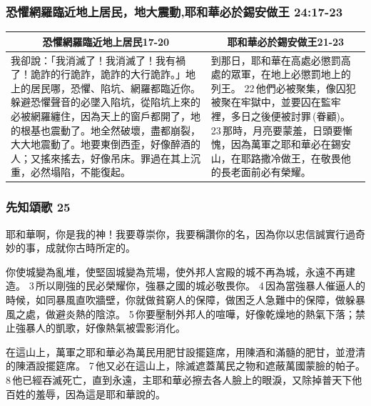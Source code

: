 \subsubsection{恐懼網羅臨近地上居民，地大震動,耶和華必於錫安做王 24:17-23}
\begin{table}[H]
\centering
\begin{tabular}{p{9.75cm}|p{7.50cm}}\hline\hline
\multicolumn{1}{c|}{恐懼網羅臨近地上居民17-20}&\multicolumn{1}{c}{耶和華必於錫安做王21-23}\\\hline
我卻說：「我消滅了！我消滅了！我有禍了！詭詐的行詭詐，詭詐的大行詭詐。」地上的居民哪，恐懼、陷坑、網羅都臨近你。躲避恐懼聲音的必墜入陷坑，從陷坑上來的必被網羅纏住，因為天上的窗戶都開了，地的根基也震動了。地全然破壞，盡都崩裂，大大地震動了。地要東倒西歪，好像醉酒的人；又搖來搖去，好像吊床。罪過在其上沉重，必然塌陷，不能復起。
&到那日，耶和華在高處必懲罰高處的眾軍，在地上必懲罰地上的列王。 22 他們必被聚集，像囚犯被聚在牢獄中，並要囚在監牢裡，多日之後便被討罪 (眷顧)。 23 那時，月亮要蒙羞，日頭要慚愧，因為萬軍之耶和華必在錫安山，在耶路撒冷做王，在敬畏他的長老面前必有榮耀。\\\hline
\end{tabular}
\end{table}


\subsubsection{先知頌歌 25}
耶和華啊，你是我的神！我要尊崇你，我要稱讚你的名，因為你以忠信誠實行過奇妙的事，成就你古時所定的。

你使城變為亂堆，使堅固城變為荒場，使外邦人宮殿的城不再為城，永遠不再建造。 3 所以剛強的民必榮耀你，強暴之國的城必敬畏你。 4 因為當強暴人催逼人的時候，如同暴風直吹牆壁，你就做貧窮人的保障，做困乏人急難中的保障，做躲暴風之處，做避炎熱的陰涼。 5 你要壓制外邦人的喧嘩，好像乾燥地的熱氣下落；禁止強暴人的凱歌，好像熱氣被雲影消化。

在這山上，萬軍之耶和華必為萬民用肥甘設擺筵席，用陳酒和滿髓的肥甘，並澄清的陳酒設擺筵席。 7 他又必在這山上，除滅遮蓋萬民之物和遮蔽萬國蒙臉的帕子。 8 他已經吞滅死亡，直到永遠，主耶和華必擦去各人臉上的眼淚，又除掉普天下他百姓的羞辱，因為這是耶和華說的。

